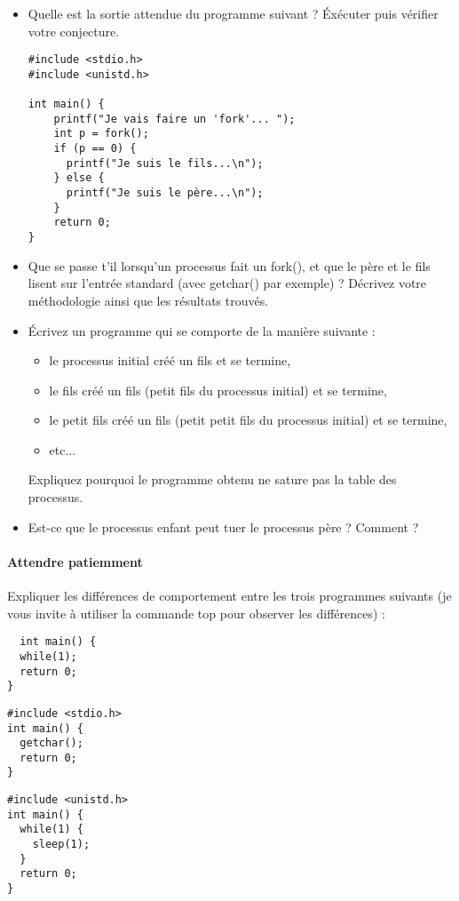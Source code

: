\documentclass[11pt]{article}
\begin{document}
\begin{itemize}
\item Quelle est la sortie attendue du programme suivant ? Éxécuter puis vérifier votre conjecture.
  \begin{verbatim}
#include <stdio.h>
#include <unistd.h>

int main() {
    printf("Je vais faire un 'fork'... ");
    int p = fork();
    if (p == 0) {
      printf("Je suis le fils...\n");
    } else {
      printf("Je suis le père...\n");
    }
    return 0;
}
\end{verbatim}
\item Que se passe t'il lorsqu'un processus fait un fork(), et que le père et le fils lisent sur l'entrée standard (avec getchar() par exemple) ? Décrivez votre méthodologie ainsi que les résultats trouvés.
\item  Écrivez un programme qui se comporte de la manière suivante :
  \begin{itemize}
  \item le processus initial créé un fils et se termine,
  \item le fils créé un fils (petit fils du processus initial) et se termine,
  \item le petit fils créé un fils (petit petit fils du processus initial) et se termine,
  \item etc...
  \end{itemize}
  Expliquez pourquoi le programme obtenu ne sature pas la table des processus.
\item Est-ce que le processus enfant peut tuer le processus père ? Comment ?
\end{itemize}

\paragraph{Attendre patiemment}

Expliquer les différences de comportement entre les trois programmes suivants (je vous invite à utiliser la commande {top} pour observer les différences) :
\begin{verbatim}
  int main() {
  while(1);
  return 0;
}
\end{verbatim}
\begin{verbatim}
#include <stdio.h>
int main() {
  getchar();
  return 0;
}
\end{verbatim}
\begin{verbatim}
#include <unistd.h>
int main() {
  while(1) {
    sleep(1);
  }
  return 0;
}
\end{verbatim}
\end{document}
